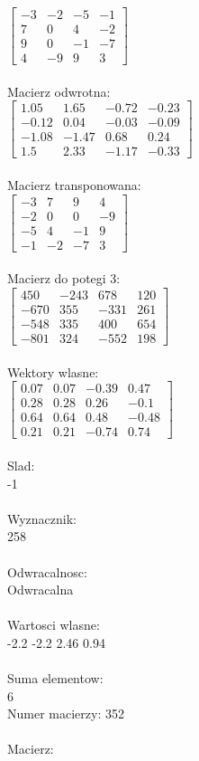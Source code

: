 \documentclass[a4paper,12pt]{article}
\begin{document}
$\begin{bmatrix} -3&-2&-5&-1\\7&0&4&-2\\9&0&-1&-7\\4&-9&9&3 \end{bmatrix}$
\\
\\
Macierz odwrotna:\\

$\begin{bmatrix} 1.05&1.65&-0.72&-0.23\\-0.12&0.04&-0.03&-0.09\\-1.08&-1.47&0.68&0.24\\1.5&2.33&-1.17&-0.33 \end{bmatrix}$
\\
\\
Macierz transponowana:\\

$\begin{bmatrix} -3&7&9&4\\-2&0&0&-9\\-5&4&-1&9\\-1&-2&-7&3 \end{bmatrix}$
\\
\\
Macierz do potegi 3:\\

$\begin{bmatrix} 450&-243&678&120\\-670&355&-331&261\\-548&335&400&654\\-801&324&-552&198 \end{bmatrix}$
\\
\\
Wektory wlasne:\\

$\begin{bmatrix} 0.07&0.07&-0.39&0.47\\0.28&0.28&0.26&-0.1\\0.64&0.64&0.48&-0.48\\0.21&0.21&-0.74&0.74 \end{bmatrix}$
\\
\\
Slad:\\
-1
\\
\\
Wyznacznik:\\
258
\\
\\
Odwracalnosc:\\
Odwracalna
\\
\\
Wartosci wlasne:\\
-2.2 -2.2 2.46 0.94
\\
\\
Suma elementow:\\
6
\\
\newpage
Numer macierzy:
352
\\
\\
Macierz:\\
\end{document}

